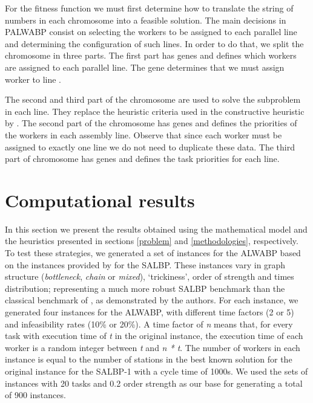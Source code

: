 \documentclass{singlecol-new}
\begin{document}
For the fitness function we must first determine how to translate the string of numbers in each chromosome into a feasible solution. The main decisions in PALWABP consist on selecting the workers to be assigned to each parallel line and determining the configuration of such lines. In order to do that, we split the chromosome in three parts. The first part has  genes and defines which workers are assigned to each parallel line. The gene  determines that we must assign worker  to line .

The second and third part of the chromosome are used to solve the subproblem in each line. They replace the heuristic criteria used in the constructive heuristic by \cite{moreira12simple}. The second part of the chromosome has  genes and defines the priorities of the workers in each assembly line. Observe that since each worker must be assigned to exactly one line we do not need to duplicate these data. The third part of chromosome has  genes and defines the task priorities for each line.

\section{Computational results}\label{computational}

In this section we present the results obtained using the mathematical model and the heuristics presented in sections \ref{problem} and \ref{methodologies}, respectively. To test these strategies, we generated a set of instances for the ALWABP based on the instances provided by \cite{otto13systematic} for the SALBP. These instances vary in graph structure (\textit{bottleneck}, \textit{chain} or \textit{mixed}), `trickiness', order of strength and times distribution; representing a much more robust SALBP benchmark than the classical benchmark of \cite{hoffmann90assembly}, as demonstrated by the authors. For each instance, we generated four instances for the ALWABP, with different time factors (2 or 5) and infeasibility rates (10\% or 20\%). A time factor of \textit{n} means that, for every task with execution time of \textit{t} in the original instance, the execution time of each worker is a random integer between \textit{t} and \textit{n * t}. The number of workers in each instance is equal to the number of stations in the best known solution for the original instance for the SALBP-1 with a cycle time of 1000s. We used the sets of instances with 20 tasks and 0.2 order strength as our base for generating a total of 900 instances.
\end{document}
